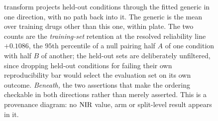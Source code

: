 \begin{figure}[htbp]
\begin{fullwidth}
{transform projects held-out conditions through the fitted generic in one
direction, with no path back into it. The generic is the mean over training
drugs other than this one, within plate. The two counts are the
\emph{training-set} retention at the resolved reliability line $+0.1086$, the
$95$th percentile of a null pairing half $A$ of one condition with half $B$ of
another; the held-out sets are deliberately unfiltered, since dropping held-out
conditions for failing their own reproducibility bar would select the
evaluation set on its own outcome. \emph{Beneath,} the two assertions that make
the ordering checkable in both directions rather than merely asserted. This is
a provenance diagram: no $\textrm{NIR}$ value, arm or split-level result appears in
it.}
\label{fig:circularity}
\end{fullwidth}
\end{figure}
